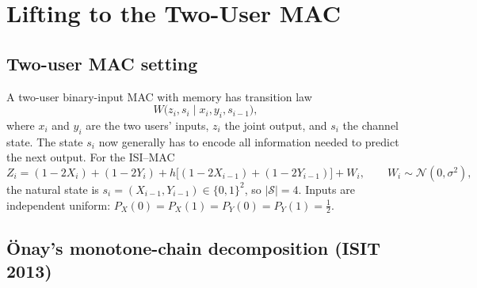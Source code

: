 \documentclass[11pt]{article}
\begin{document}
\section{Lifting to the Two-User MAC}\label{sec:lift}

\subsection{Two-user MAC setting}

A two-user binary-input MAC with memory has transition law
\[
  W\bigl(z_i, s_i \mid x_i, y_i, s_{i-1}\bigr),
\]
where $x_i$ and $y_i$ are the two users' inputs, $z_i$ the joint output, and
$s_i$ the channel state.  The state $s_i$ now generally has to encode all
information needed to predict the next output.  For the ISI--MAC
\[
  Z_i = (1-2X_i) + (1-2Y_i) + h\bigl[(1-2X_{i-1}) + (1-2Y_{i-1})\bigr] + W_i,
  \qquad W_i\sim\mathcal{N}(0,\sigma^2),
\]
the natural state is $s_i = (X_{i-1}, Y_{i-1}) \in \{0,1\}^2$, so
$|\mathcal{S}| = 4$.  Inputs are independent uniform: $P_{X}(0)=P_{X}(1)=
P_{Y}(0)=P_{Y}(1)=\tfrac{1}{2}$.

\subsection{\"{O}nay's monotone-chain decomposition (ISIT 2013)}
\end{document}
